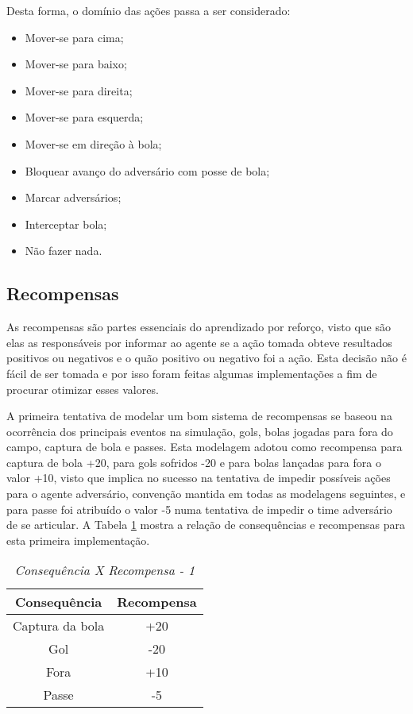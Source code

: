 Desta forma, o domínio das ações passa a ser considerado:

\begin{itemize}
    \item Mover-se para cima;
    \item Mover-se para baixo;
    \item Mover-se para direita;
    \item Mover-se para esquerda;
    \item Mover-se em direção à bola;
    \item Bloquear avanço do adversário com posse de bola;
    \item Marcar adversários;
    \item Interceptar bola;
    \item Não fazer nada.
\end{itemize}

\subsection{Recompensas}\label{rewards}

As recompensas são partes essenciais do aprendizado por reforço, visto que são
elas as responsáveis por informar ao agente se a ação tomada obteve resultados
positivos ou negativos e o quão positivo ou negativo foi a ação. Esta decisão
não é fácil de ser tomada e por isso foram feitas algumas implementações a fim
de procurar otimizar esses valores.

A primeira tentativa de modelar um bom sistema de recompensas se baseou na
ocorrência dos principais eventos na simulação, gols, bolas jogadas para fora do
campo, captura de bola e passes. Esta modelagem adotou como recompensa para
captura de bola +20, para gols sofridos -20 e para bolas lançadas para fora o
valor +10, visto que implica no sucesso na tentativa de impedir possíveis ações para o
agente adversário, convenção mantida em todas as
modelagens seguintes, e para passe foi atribuído o valor -5 numa tentativa de
impedir o time adversário de se articular. A Tabela \ref{tab:rewards1} mostra a
relação de consequências e recompensas para esta primeira implementação.

\begin{table}[hbt]
    \centering
    \begin{tabular}{c|c}
        Consequência    &   Recompensa  \\ \hline
        Captura da bola &   +20 \\
        Gol             &   -20 \\
        Fora            &   +10 \\
        Passe           &   -5  \\
    \end{tabular}
    \caption{\textit{Consequência X Recompensa - 1}}
    \label{tab:rewards1}
\end{table}

